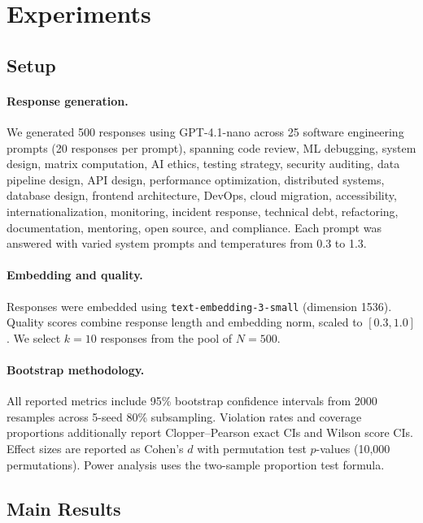 \documentclass[10pt]{article}
\begin{document}
\section{Experiments}
\label{sec:experiments}

\subsection{Setup}
\label{sec:setup}

\paragraph{Response generation.}
We generated 500 responses using GPT-4.1-nano across 25 software engineering prompts (20 responses per prompt), spanning code review, ML debugging, system design, matrix computation, AI ethics, testing strategy, security auditing, data pipeline design, API design, performance optimization, distributed systems, database design, frontend architecture, DevOps, cloud migration, accessibility, internationalization, monitoring, incident response, technical debt, refactoring, documentation, mentoring, open source, and compliance.
Each prompt was answered with varied system prompts and temperatures from 0.3 to 1.3.

\paragraph{Embedding and quality.}
Responses were embedded using \texttt{text-embedding-3-small} (dimension 1536).
Quality scores combine response length and embedding norm, scaled to $[0.3, 1.0]$.
We select $k=10$ responses from the pool of $N=500$.

\paragraph{Bootstrap methodology.}
All reported metrics include 95\% bootstrap confidence intervals from 2000 resamples across 5-seed 80\% subsampling.
Violation rates and coverage proportions additionally report Clopper--Pearson exact CIs and Wilson score CIs.
Effect sizes are reported as Cohen's $d$ with permutation test $p$-values (10{,}000 permutations).
Power analysis uses the two-sample proportion test formula.

\subsection{Main Results}
\label{sec:main-results}
\end{document}
